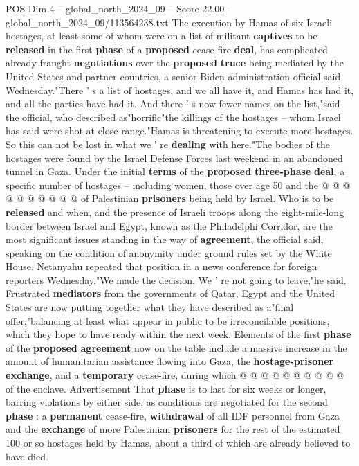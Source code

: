 \begin{textsample}{POS Dim 4 – global\_north\_2024\_09 – Score 22.00 – global\_north\_2024\_09/113564238.txt}  \label{ex:f4_pos_311}
The execution by Hamas of six Israeli hostages, at least some of whom were on a list of militant \textbf{captives} to be \textbf{released} in the first \textbf{phase} of a \textbf{proposed} cease-fire \textbf{deal}, has complicated already fraught \textbf{negotiations} over the \textbf{proposed} \textbf{truce} being mediated by the United States and partner countries, a senior Biden administration official said Wednesday."There ' s a list of hostages, and we all have it, and Hamas has had it, and all the parties have had it.
And there ' s now fewer names on the list,"said the official, who described as"horrific"the killings of the hostages -- whom Israel has said were shot at close range."Hamas is threatening to execute more hostages.
So this can not be lost in what we ' re \textbf{dealing} with here."The bodies of the hostages were found by the Israel Defense Forces last weekend in an abandoned tunnel in Gaza.
Under the initial \textbf{terms} of the \textbf{proposed} \textbf{three-phase} \textbf{deal}, a specific number of hostages -- including women, those over age 50 and the @ @ @ @ @ @ @ @ @ @ of Palestinian \textbf{prisoners} being held by Israel.
Who is to be \textbf{released} and when, and the presence of Israeli troops along the eight-mile-long border between Israel and Egypt, known as the Philadelphi Corridor, are the most significant issues standing in the way of \textbf{agreement}, the official said, speaking on the condition of anonymity under ground rules set by the White House.
Netanyahu repeated that position in a news conference for foreign reporters Wednesday."We made the decision.
We ' re not going to leave,"he said.
Frustrated \textbf{mediators} from the governments of Qatar, Egypt and the United States are now putting together what they have described as a"final offer,"balancing at least what appear in public to be irreconcilable positions, which they hope to have ready within the next week.
Elements of the first \textbf{phase} of the \textbf{proposed} \textbf{agreement} now on the table include a massive increase in the amount of humanitarian assistance flowing into Gaza, the \textbf{hostage-prisoner} \textbf{exchange}, and a \textbf{temporary} cease-fire, during which @ @ @ @ @ @ @ @ @ @ of the enclave.
Advertisement That \textbf{phase} is to last for six weeks or longer, barring violations by either side, as conditions are negotiated for the second \textbf{phase} : a \textbf{permanent} cease-fire, \textbf{withdrawal} of all IDF personnel from Gaza and the \textbf{exchange} of more Palestinian \textbf{prisoners} for the rest of the estimated 100 or so hostages held by Hamas, about a third of which are already believed to have died.

\end{textsample}
